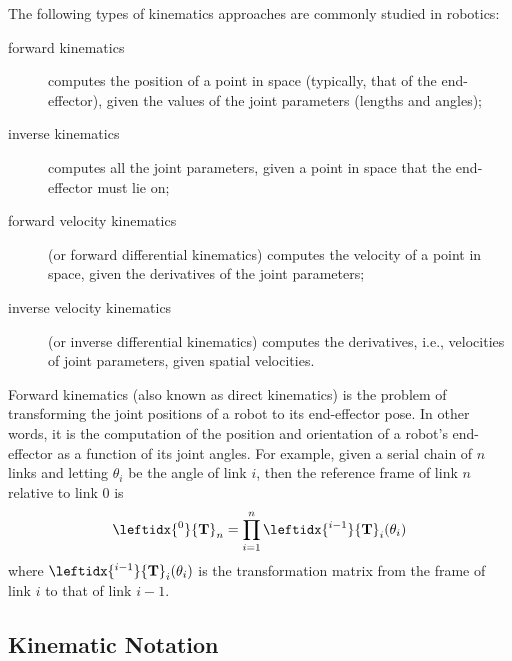 The following types of kinematics approaches are commonly studied in robotics:
\begin{description}
\item[forward kinematics] computes the position of a point in space (typically, that of the end-effector), given the values of the joint parameters (lengths and angles);

\item[inverse kinematics] computes all the joint parameters, given a point in space that the end-effector must lie on;

\item[forward velocity kinematics] (or forward differential kinematics) computes the velocity of a point in space, given the derivatives of the joint parameters;

\item[inverse velocity kinematics] (or inverse differential kinematics) computes the derivatives, i.e., velocities of joint parameters, given spatial velocities.
\end{description}

Forward kinematics (also known as direct kinematics) is the problem of transforming the joint positions of a robot to its end-effector pose. In other words, it is the computation of the position and orientation of a robot's end-effector as a function of its joint angles. For example, given a serial chain of $n$ links and letting $\theta_i$ be the angle of link $i$, then the reference frame of link $n$ relative to link $0$ is
\[
\leftidx{^0} {\mathbf{T}}_n = \prod_{i=1}^n  \leftidx{^{i-1}}{\mathbf{T}}_i (\theta_i)
\]
where $\leftidx{^{i-1}}{\mathbf{T}}_i(\theta_i)$ is the transformation matrix from the frame of link $i$ to that of link $i-1$.


\subsection{Kinematic Notation}
 

